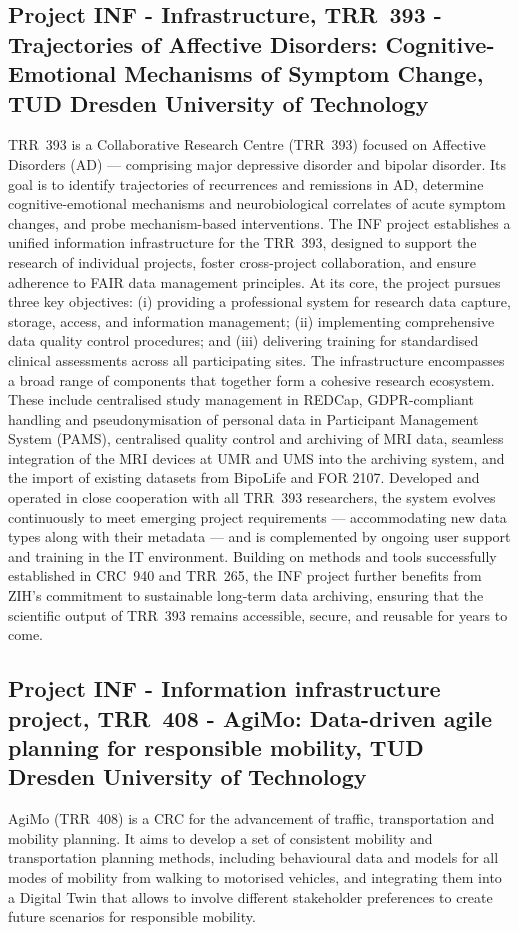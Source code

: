 \documentclass{eceasst}
\begin{document}
\subsection{Project INF - Infrastructure, TRR~393 - Trajectories of Affective Disorders: Cognitive-Emotional Mechanisms of Symptom Change, TUD Dresden University of Technology}
\label{subsec:trr393}
TRR~393 is a Collaborative Research Centre (TRR~393) focused on Affective Disorders (AD) — comprising major depressive disorder and bipolar disorder. Its goal is to identify trajectories of recurrences and remissions in AD, determine cognitive-emotional mechanisms and neurobiological correlates of acute symptom changes, and probe mechanism-based interventions.
The INF project establishes a unified information infrastructure for the TRR~393, designed to support the research of individual projects, foster cross-project collaboration, and ensure adherence to FAIR data management principles.
At its core, the project pursues three key objectives:
(i) providing a professional system for research data capture, storage, access, and information management; 
(ii) implementing comprehensive data quality control procedures; and 
(iii) delivering training for standardised clinical assessments across all participating sites.
The infrastructure encompasses a broad range of components that together form a cohesive research ecosystem.
These include centralised study management in REDCap, GDPR-compliant handling and pseudonymisation of personal data in Participant Management System (PAMS),
centralised quality control and archiving of MRI data, seamless integration of the MRI devices at UMR and UMS into the archiving system, and the import of existing datasets from BipoLife and FOR 2107.
Developed and operated in close cooperation with all TRR~393 researchers, the system evolves continuously to meet emerging project requirements — accommodating new data types along with their metadata — and is complemented by ongoing user support and training in the IT environment.
Building on methods and tools successfully established in CRC~940 and TRR~265, the INF project further benefits from ZIH's commitment to sustainable long-term data archiving, ensuring that the scientific output of TRR~393 remains accessible, secure, and reusable for years to come.

\subsection{Project INF - Information infrastructure project, TRR~408 - AgiMo: Data-driven agile planning for responsible mobility, TUD Dresden University of Technology}
\label{subsec:trr408}
AgiMo (TRR~408) is a CRC for the advancement of traffic, transportation and mobility planning.
It aims to develop a set of consistent mobility and transportation planning methods, including behavioural data and models for all modes of mobility from walking to motorised vehicles, and integrating them into a Digital Twin that allows to involve different stakeholder preferences to create future scenarios for responsible mobility.
\end{document}
